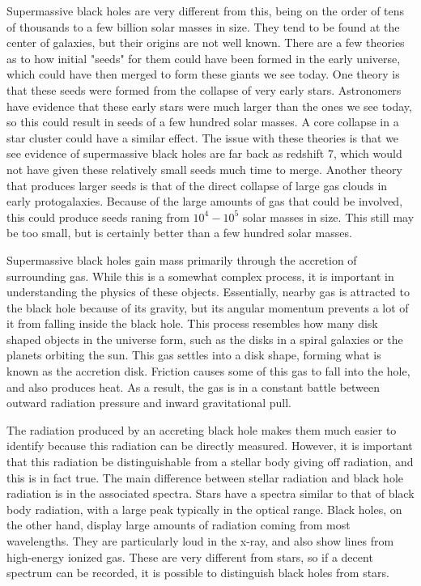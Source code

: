 \documentclass[12pt]{article}
\begin{document}
Supermassive black holes are very different from this, being on the
order of tens of thousands to a few billion solar masses in size.  They tend to
be found at the center of galaxies, but their origins are not well known.  There
are a few theories as to how initial "seeds" for them could have been formed in
the early universe, which could have then merged to form these giants we see
today.  One theory is that these seeds were formed from the collapse of very
early stars.  Astronomers have evidence that these early stars were much larger
than the ones we see today, so this could result in seeds of a few hundred solar
masses.  A core collapse in a star cluster could have a similar effect.  The
issue with these theories is that we see evidence of supermassive black holes
are far back as redshift 7, which would not have given these relatively small
seeds much time to merge.  Another theory that produces larger seeds is that of
the direct collapse of large gas clouds in early protogalaxies.  Because of the
large amounts of gas that could be involved, this could produce seeds raning
from $10^4-10^5$ solar masses in size.  This still may be too small, but is
certainly better than a few hundred solar masses.

Supermassive black holes gain mass primarily through the accretion of
surrounding gas.  While this is a somewhat complex process, it is important in
understanding the physics of these objects.  Essentially, nearby gas is
attracted to the black hole because of its gravity, but its angular momentum
prevents a lot of it from falling inside the black hole.  This process resembles
how many disk shaped objects in the universe form, such as the disks in a spiral
galaxies or the planets orbiting the sun.  This gas settles into a disk shape,
forming what is known as the accretion disk.  Friction causes some of this gas
to fall into the hole, and also produces heat.  As a result, the gas is in a
constant battle between outward radiation pressure and inward gravitational
pull.

The radiation produced by an accreting black hole makes them much easier to
identify because this radiation can be directly measured.  However, it is
important that this radiation be distinguishable from a stellar body giving off
radiation, and this is in fact true.  The main difference between stellar
radiation and black hole radiation is in the associated spectra.  Stars have a
spectra similar to that of black body radiation, with a large peak typically in
the optical range.  Black holes, on the other hand, display large amounts of
radiation coming from most wavelengths.  They are particularly loud in the
x-ray, and also show lines from high-energy ionized gas.  These are very
different from stars, so if a decent spectrum can be recorded, it is possible to
distinguish black holes from stars.
\end{document}
